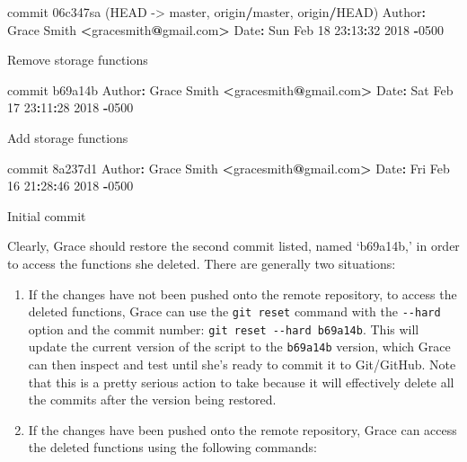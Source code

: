 \documentclass[]{book}
\newenvironment{Shaded}{\begin{snugshade}}{\end{snugshade}}
\newcommand{\DecValTok}[1]{\textcolor[rgb]{0.00,0.00,0.81}{#1}}
\newcommand{\StringTok}[1]{\textcolor[rgb]{0.31,0.60,0.02}{#1}}
\newcommand{\OperatorTok}[1]{\textcolor[rgb]{0.81,0.36,0.00}{\textbf{#1}}}
\newcommand{\NormalTok}[1]{#1}
\begin{document}
\begin{Shaded}
\begin{Highlighting}[]
\NormalTok{commit 06c347sa (HEAD ->}\StringTok{ }\NormalTok{master, origin}\OperatorTok{/}\NormalTok{master, origin}\OperatorTok{/}\NormalTok{HEAD)}
\NormalTok{Author}\OperatorTok{:}\StringTok{ }\NormalTok{Grace Smith }\OperatorTok{<}\NormalTok{gracesmith}\OperatorTok{@}\NormalTok{gmail.com}\OperatorTok{>}
\NormalTok{Date}\OperatorTok{:}\StringTok{   }\NormalTok{Sun Feb }\DecValTok{18} \DecValTok{23}\OperatorTok{:}\DecValTok{13}\OperatorTok{:}\DecValTok{32} \DecValTok{2018} \OperatorTok{-}\DecValTok{0500}

\NormalTok{    Remove storage functions}

\NormalTok{commit b69a14b}
\NormalTok{Author}\OperatorTok{:}\StringTok{ }\NormalTok{Grace Smith }\OperatorTok{<}\NormalTok{gracesmith}\OperatorTok{@}\NormalTok{gmail.com}\OperatorTok{>}
\NormalTok{Date}\OperatorTok{:}\StringTok{   }\NormalTok{Sat Feb }\DecValTok{17} \DecValTok{23}\OperatorTok{:}\DecValTok{11}\OperatorTok{:}\DecValTok{28} \DecValTok{2018} \OperatorTok{-}\DecValTok{0500}

\NormalTok{    Add storage functions}

\NormalTok{commit 8a237d1}
\NormalTok{Author}\OperatorTok{:}\StringTok{ }\NormalTok{Grace Smith }\OperatorTok{<}\NormalTok{gracesmith}\OperatorTok{@}\NormalTok{gmail.com}\OperatorTok{>}
\NormalTok{Date}\OperatorTok{:}\StringTok{   }\NormalTok{Fri Feb }\DecValTok{16} \DecValTok{21}\OperatorTok{:}\DecValTok{28}\OperatorTok{:}\DecValTok{46} \DecValTok{2018} \OperatorTok{-}\DecValTok{0500}

\NormalTok{    Initial commit}
\end{Highlighting}
\end{Shaded}

Clearly, Grace should restore the second commit listed, named `b69a14b,'
in order to access the functions she deleted. There are generally two
situations:

\begin{enumerate}
\def\labelenumi{\arabic{enumi}.}
\item
  If the changes have not been pushed onto the remote repository, to
  access the deleted functions, Grace can use the \texttt{git\ reset}
  command with the \texttt{-\/-hard} option and the commit number:
  \texttt{git\ reset\ -\/-hard\ b69a14b}. This will update the current
  version of the script to the \texttt{b69a14b} version, which Grace can
  then inspect and test until she's ready to commit it to Git/GitHub.
  Note that this is a pretty serious action to take because it will
  effectively delete all the commits after the version being restored.
\item
  If the changes have been pushed onto the remote repository, Grace can
  access the deleted functions using the following commands:
\end{enumerate}
\end{document}
